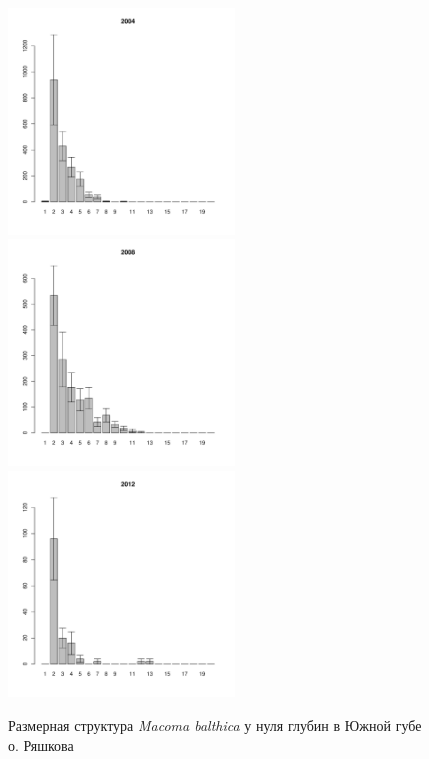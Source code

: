 \documentclass[12pt, a4paper]{article}
\begin{document}
\begin{figure}[h]
\begin{multicols}{3}
\hfill
\includegraphics[width=60mm]{../White_Sea/Ryashkov_YuG/YuG_2004_.pdf}
\hfill
\includegraphics[width=60mm]{../White_Sea/Ryashkov_YuG/YuG_2008_.pdf}
\hfill
\includegraphics[width=60mm]{../White_Sea/Ryashkov_YuG/YuG_2012_.pdf}
\end{multicols}


\caption{Размерная структура {\it Macoma balthica} у нуля глубин в Южной губе о. Ряшкова}
\label{ris:size_str_YuG}
\end{figure}
\end{document}

